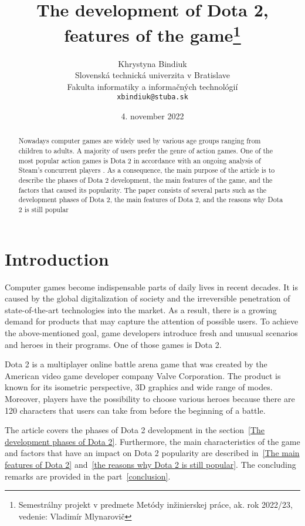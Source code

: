 \documentclass[12pt,twoside,english,a4paper]{article}
\title{The development of Dota 2, features of the game\thanks{Semestrálny projekt v predmete Metódy inžinierskej práce, ak. rok 2022/23, vedenie: Vladimír Mlynarovič}} %
\author{Khrystyna Bindiuk\\[2pt]
	{\small Slovenská technická univerzita v Bratislave}\\
	{\small Fakulta informatiky a informačných technológií}\\
	{\small \texttt{xbindiuk@stuba.sk}}
	}
\date{\small 4. november 2022} %
\begin{document}
\maketitle

\begin{abstract}

Nowadays computer games are widely used by various age groups ranging from children to adults. A majority of users prefer the genre of action games\cite{Research:Top}. One of the most popular action games is Dota 2 in accordance with an ongoing analysis of Steam's concurrent players \cite{Steam:Dota}. As a consequence, the main purpose of the article is to describe the phases of Dota 2 development, the main features of the game, and the factors that caused its popularity. The paper consists of several parts such as the development phases of Dota 2, the main features of Dota 2, and the reasons why Dota 2 is still popular
\end{abstract}



\section{Introduction}

Computer games become indispensable parts of daily lives in recent decades. It is caused by the global digitalization of society and the irreversible penetration of state-of-the-art technologies into the market. As a result, there is a growing demand for products that may capture the attention of possible users. To achieve the above-mentioned goal, game developers introduce fresh and unusual scenarios and heroes in their programs. One of those games is Dota 2. 

Dota 2 is a multiplayer online battle arena game that was created by the American video game developer company Valve Corporation. The product is known for its isometric perspective, 3D graphics and wide range of modes. Moreover, players have the possibility to choose various heroes because there are 120 characters that users can take from before the beginning of a battle.

The article covers the phases of Dota 2 development in the section~\ref{The development phases of Dota 2}. Furthermore, the main characteristics of the game and factors that have an impact on Dota 2 popularity are described in~\ref{The main features of Dota 2} and~\ref{the reasons why Dota 2 is still popular}. The concluding remarks are provided in the part~\ref{conclusion}.
\end{document}
